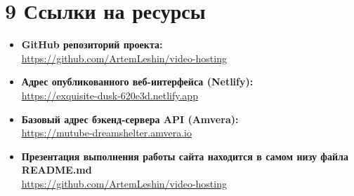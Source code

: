 \documentclass[a4paper,14pt,oneside,openany]{memoir}
\begin{document}
\section{9 Ссылки на ресурсы}
\begin{itemize}
    \item \textbf{GitHub репозиторий проекта:} \\ \url{https://github.com/ArtemLeshin/video-hosting}
    \item \textbf{Адрес опубликованного веб-интерфейса (Netlify):} \\ \url{https://exquisite-dusk-620e3d.netlify.app}
    \item \textbf{Базовый адрес бэкенд-сервера API (Amvera):} \\ \url{https://mutube-dreamshelter.amvera.io}
    \item \textbf{Презентация выполнения работы сайта находится в самом низу файла README.md} \\ \url{https://github.com/ArtemLeshin/video-hosting}
\end{itemize}
\end{document}
